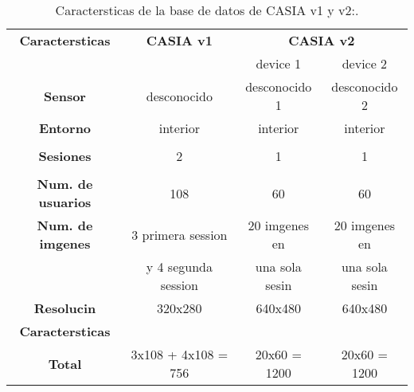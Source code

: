 \begin{table}[h]
    \centering
    \scriptsize
    \begin{tabular}{|c|c|c|c|}
        \hline
        \textbf{Caractersticas}   & \textbf{CASIA v1}      & \multicolumn{2}{|c|}{\textbf{CASIA v2}} \\
        \cline{3-4}
                                   &                        & device 1          & device 2       \\
        \hline
        \textbf{Sensor}            & desconocido            & desconocido 1     & desconocido 2  \\
        \hline
        \textbf{Entorno}           & interior               & interior          & interior        \\
        \hline
                                   &                        &                   &                \\
        \textbf{Sesiones}          & 2                      & 1                 & 1              \\
                                   &                        &                   &                \\
        \hline
        \textbf{Num. de usuarios}  & 108                    & 60                & 60             \\
        \hline
        \textbf{Num. de imgenes}  & 3 primera session      & 20 imgenes en    & 20 imgenes en \\
                                   & y 4 segunda session    & una sola sesin   & una sola sesin\\
        \hline
        \textbf{Resolucin}        & 320x280                & 640x480           & 640x480        \\
        \hline
        \textbf{Caractersticas}   &                        &                   &                \\
        \hline
        \textbf{Total}             & 3x108 + 4x108 = 756    & 20x60 = 1200      & 20x60 = 1200   \\
        \hline
    \end{tabular}
    \caption{Caractersticas de la base de datos de CASIA v1 y v2:\citet{database:CASIA_web}.}
    \label{table:info_CASIAv1_2}
\end{table}

